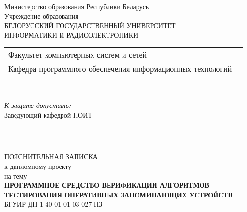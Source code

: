 \begin{titlepage}
  \begin{center}
    Министерство образования Республики Беларусь\\[1em]
    Учреждение образования\\
    БЕЛОРУССКИЙ ГОСУДАРСТВЕННЫЙ УНИВЕРСИТЕТ \\
    ИНФОРМАТИКИ И РАДИОЭЛЕКТРОНИКИ\\[1em]

    \begin{minipage}{\textwidth}
      \begin{flushleft}
        \begin{tabular}{ l l }
          Факультет компьютерных систем и сетей\\
          Кафедра программного обеспечения информационных технологий
        \end{tabular}
      \end{flushleft}
    \end{minipage}\\[1em]

    \begin{flushright}
      \begin{minipage}{0.4\textwidth}
        \textit{К защите допустить:}\\[0.8em]
        Заведующий кафедрой ПОИТ\\[0.45em]
        \underline{\hspace*{2.8cm}} -
      \end{minipage}\\[2.2em]
    \end{flushright}

    {ПОЯСНИТЕЛЬНАЯ ЗАПИСКА}\\
    {к дипломному проекту}\\
    {на тему}\\[1em]
    \textbf{\MakeUppercase{Программное средство верификации алгоритмов тестирования оперативных запоминающих устройств}}\\[1em]


    {БГУИР ДП 1-40 01 01 03 027 ПЗ}\\[2em]
    

\end{center}
\end{titlepage}
